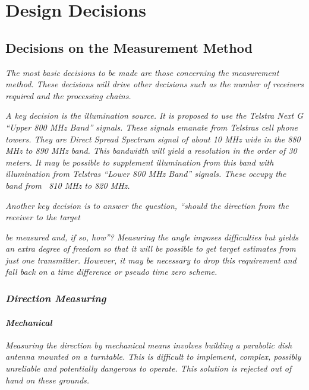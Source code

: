 \documentclass[a4paper]{report}
\newcommand\textstyleEmphasis[1]{\textit{#1}}
\numberwithin{equation}{chapter}
\begin{document}
\clearpage\setcounter{page}{1}
\chapter[Design Decisions]{Design Decisions}
\section[Decisions on the Measurement Method]{Decisions on the Measurement Method}
\textstyleEmphasis{\textup{The most
basic}}\textstyleEmphasis{\textbf{\textup{
}}}\textstyleEmphasis{\textup{decisions to be made are those concerning
the measurement method. These decisions will drive other decisions such
as the number of receivers required and the processing chains.}}

\bigskip

\textstyleEmphasis{\textup{A key decision is the illumination source. It
is proposed to use the Telstra Next G {\textquotedblleft}Upper 800 MHz
Band{\textquotedblright} signals. These signals emanate from
Telstra{\textquotesingle}s cell phone towers. They are Direct Spread
Spectrum signal of about 10 MHz wide in the 880 MHz to 890 MHz band.
This bandwidth will yield a resolution in the order of 30 meters. It
may be possible to supplement illumination from this band with
illumination from Telstra{\textquotesingle}s {\textquotedblleft}Lower
800 MHz Band{\textquotedblright} signals. These occupy the band from
\ 810 MHz to 820 MHz.}}

\bigskip

\textstyleEmphasis{\textup{Another key decision is to answer the
question, {\textquotedblleft}should the direction from the receiver to
the target }}

\bigskip

\textstyleEmphasis{\textup{be measured and, if so,
how{\textquotedblright}? Measuring the angle imposes difficulties but
yields an extra degree of freedom so that it will be possible to get
target estimates from just one transmitter. However, it may be
necessary to drop this requirement and fall back on a time difference
or pseudo time zero scheme.}}

\subsection[Direction Measuring]{\textstyleEmphasis{\textup{Direction
Measuring}}}
\subsubsection[Mechanical]{\textstyleEmphasis{\textup{Mechanical}}}
\textstyleEmphasis{\textup{Measuring the direction by mechanical means
involves building a parabolic dish antenna mounted on a turntable. This
is difficult to implement, complex, possibly unreliable and potentially
dangerous to operate. This solution is rejected out of hand on these
grounds.}}
\end{document}
